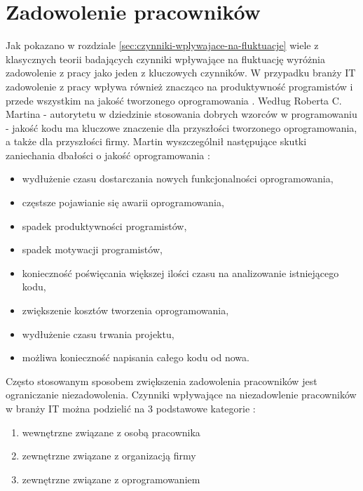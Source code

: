 %
%


\section{Zadowolenie pracowników}\label{sec:it-motivation}
Jak pokazano w rozdziale \ref{sec:czynniki-wplywajace-na-fluktuacje} wiele z klasycznych teorii badających czynniki wpływające na fluktuację wyróżnia zadowolenie z pracy jako jeden z kluczowych czynników.
W przypadku branży IT zadowolenie z pracy wpływa również znacząco na produktywność programistów i przede wszystkim na jakość tworzonego oprogramowania \cite{graziotin-2018}.
Według Roberta C. Martina - autorytetu w dziedzinie stosowania dobrych wzorców w programowaniu - jakość kodu ma kluczowe znaczenie dla przyszłości tworzonego oprogramowania, a także dla przyszłości firmy.
Martin wyszczególnił następujące skutki zaniechania dbałości o jakość oprogramowania \cite{martin-2014}:
\begin{itemize}
    \item wydłużenie czasu dostarczania nowych funkcjonalności oprogramowania,
    \item częstsze pojawianie się awarii oprogramowania,
    \item spadek produktywności programistów,
    \item spadek motywacji programistów,
    \item konieczność poświęcania większej ilości czasu na analizowanie istniejącego kodu,
    \item zwiększenie kosztów tworzenia oprogramowania,
    \item wydłużenie czasu trwania projektu,
    \item możliwa konieczność napisania całego kodu od nowa.
\end{itemize}

Często stosowanym sposobem zwiększenia zadowolenia pracowników jest ograniczanie niezadowolenia.
Czynniki wpływające na niezadowlenie pracowników w branży IT można podzielić na 3 podstawowe kategorie \cite{graziotin-2017}:
\begin{enumerate}
    \item wewnętrzne związane z osobą pracownika
    \item zewnętrzne związane z organizacją firmy
    \item zewnętrzne związane z oprogramowaniem
\end{enumerate}

